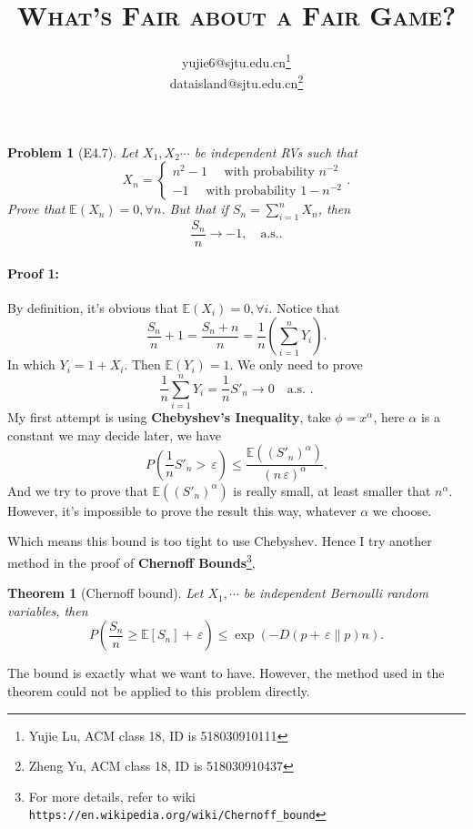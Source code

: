 \documentclass[UTF8]{article}
\author{
	yujie6@sjtu.edu.cn\footnote{Yujie Lu, ACM class 18, ID is 518030910111} \\
	dataisland@sjtu.edu.cn\footnote{Zheng Yu, ACM class 18, ID is 518030910437}
}
\title{\textsc{What's Fair about a Fair Game?}}
\newtheorem{thm}{Theorem}
\newtheorem{pro}{Problem}
\let\ldots\cdots
\newcommand\ep{\,\varepsilon}
\begin{document}
\maketitle
        
\begin{pro}[E4.7]
Let $X_1,X_2\ldots$ be independent RVs such that 
\[
X_{n} = \begin{cases}
		 n^2-1 \quad \text{ with probability } n^{-2} \\
		 -1 \quad \text{ with probability } 1- n^{-2}  
\end{cases}
.\]  
Prove that $\mathbb{E} \left( X_{n} \right) = 0, \forall n$. But that if $S_{n} = \sum_{i=1}^{n} X_{n}$, then 
\[
\frac{S_n}{n} \to  -1 , \quad \text{a.s.}
.\] 
\end{pro}
\paragraph{Proof 1:}
		By definition, it's obvious that $\mathbb{E} \left( X_{i} \right) = 0,\forall i$.
		Notice that 
		\[
				\frac{S_n}{n}+1 =  \frac{S_n + n}{n} = 
				\frac{1}{n}\left( \sum_{i=1}^{n} Y_{i} \right) 
		.\] 
		In which $Y_{i} = 1 + X_{i}$. Then 
		$\mathbb{E}\left( Y_{i} \right) = 1$. We only need to prove
		\[
		\frac{1}{n} \sum_{i=1}^{n} Y_{i}= \frac{1}{n}S'_{n} \to 0 \quad \text{a.s. }
		.\] 
		My first attempt is using \textbf{Chebyshev's Inequality}, 
		take $\phi=x^{\alpha }$, here 
		$\alpha $ is a constant we may decide later, we have 
		\[
				P\left( \frac{1}{n} S'_{n} > \ep \right) 
				\le \frac{\mathbb{E} \left( \left( S'_{n} \right) ^{\alpha } \right)  }{ \left( n\ep \right) ^{ \alpha  } }
		.\] 
		And we try to prove that $\mathbb{E} \left( \left( S'_{n} \right) ^{\alpha } \right) $ is really small, at least smaller that $n^{\alpha }$. 
However, it's impossible to prove the result this way, whatever $\alpha $ we choose.

		Which means this bound is too tight to use Chebyshev. Hence I try another
		method in the proof of \textbf{Chernoff Bounds}\footnote{For more details, 
refer to wiki \texttt{https://en.wikipedia.org/wiki/Chernoff\_bound} }, 
		\begin{thm}[Chernoff bound]
				Let $X_1,\ldots$ be independent Bernoulli random variables, 
				then 
				\[
						P\left( \frac{S_n}{n} \ge \mathbb{E}\left[ S_n \right] + \ep \right) \le \exp\left( -D\left( p+\ep \parallel p \right) n \right) 
				.\] 
		\end{thm}
The bound is exactly what we want to have. However, the method used in the theorem 
could not be applied to this problem directly.
\end{document}
